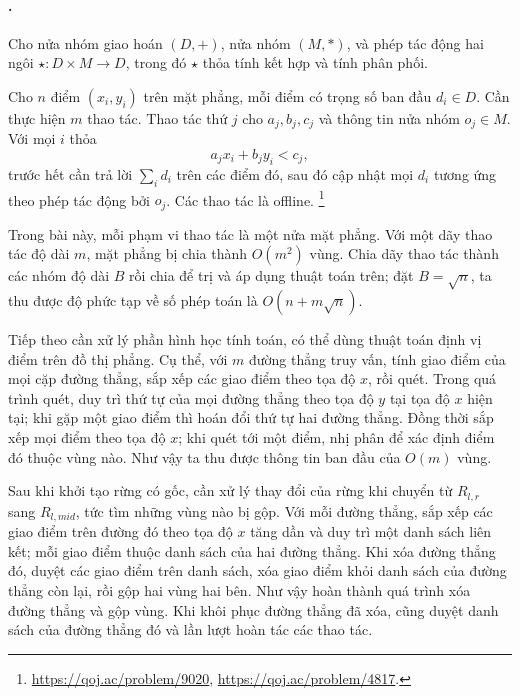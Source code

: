\documentclass[11pt]{article}
\begin{document}
\paragraph{.}

Cho nửa nhóm giao hoán \((D,+)\), nửa nhóm \((M,*)\), và phép tác động hai ngôi
\(\star:D\times M\to D\), trong đó \(\star\) thỏa tính kết hợp và tính phân
phối.

Cho \(n\) điểm \((x_i,y_i)\) trên mặt phẳng, mỗi điểm có trọng số ban đầu
\(d_i\in D\). Cần thực hiện \(m\) thao tác. Thao tác thứ \(j\) cho
\(a_j,b_j,c_j\) và thông tin nửa nhóm \(o_j\in M\). Với mọi \(i\) thỏa
\[
  a_jx_i+b_jy_i<c_j,
\]
trước hết cần trả lời \(\sum_i d_i\) trên các điểm đó, sau đó cập nhật mọi
\(d_i\) tương ứng theo phép tác động bởi \(o_j\). Các thao tác là offline.
\footnote{\url{https://qoj.ac/problem/9020},
\url{https://qoj.ac/problem/4817}.}

Trong bài này, mỗi phạm vi thao tác là một nửa mặt phẳng. Với một dãy thao tác
độ dài \(m\), mặt phẳng bị chia thành \(O(m^2)\) vùng. Chia dãy thao tác thành
các nhóm độ dài \(B\) rồi chia để trị và áp dụng thuật toán trên; đặt
\(B=\sqrt n\), ta thu được độ phức tạp về số phép toán là \(O(n+m\sqrt n)\).

Tiếp theo cần xử lý phần hình học tính toán, có thể dùng thuật toán định vị
điểm trên đồ thị phẳng. Cụ thể, với \(m\) đường thẳng truy vấn, tính giao điểm
của mọi cặp đường thẳng, sắp xếp các giao điểm theo tọa độ \(x\), rồi quét.
Trong quá trình quét, duy trì thứ tự của mọi đường thẳng theo tọa độ \(y\) tại
tọa độ \(x\) hiện tại; khi gặp một giao điểm thì hoán đổi thứ tự hai đường
thẳng. Đồng thời sắp xếp mọi điểm theo tọa độ \(x\); khi quét tới một điểm, nhị
phân để xác định điểm đó thuộc vùng nào. Như vậy ta thu được thông tin ban đầu
của \(O(m)\) vùng.

Sau khi khởi tạo rừng có gốc, cần xử lý thay đổi của rừng khi chuyển từ
\(R_{l,r}\) sang \(R_{l,\mathit{mid}}\), tức tìm những vùng nào bị gộp. Với mỗi
đường thẳng, sắp xếp các giao điểm trên đường đó theo tọa độ \(x\) tăng dần và
duy trì một danh sách liên kết; mỗi giao điểm thuộc danh sách của hai đường
thẳng. Khi xóa đường thẳng đó, duyệt các giao điểm trên danh sách, xóa giao
điểm khỏi danh sách của đường thẳng còn lại, rồi gộp hai vùng hai bên. Như vậy
hoàn thành quá trình xóa đường thẳng và gộp vùng. Khi khôi phục đường thẳng đã
xóa, cũng duyệt danh sách của đường thẳng đó và lần lượt hoàn tác các thao tác.
\end{document}
